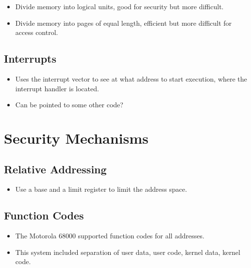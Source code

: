 \begin{frame}
  \begin{itemize}
    \item Divide memory into logical units, good for security but more 
      difficult.
    \item Divide memory into pages of equal length, efficient but more 
      difficult for access control.
  \end{itemize}
\end{frame}

\subsection{Interrupts}

\begin{frame}
  \begin{itemize}
    \item Uses the interrupt vector to see at what address to start execution, 
      where the interrupt handler is located.

    \item Can be pointed to some other code?

  \end{itemize}
\end{frame}


\section{Security Mechanisms}

\subsection{Relative Addressing}

\begin{frame}
  \begin{itemize}
    \item Use a base and a limit register to limit the address space.
  \end{itemize}
\end{frame}

\subsection{Function Codes}

\begin{frame}
  \begin{itemize}
    \item The Motorola 68000 supported function codes for all addresses.
    \item This system included separation of user data, user code, kernel data, 
      kernel code.
  \end{itemize}
\end{frame}



\begin{frame}[allowframebreaks]
  \printbibliography{}
\end{frame}
